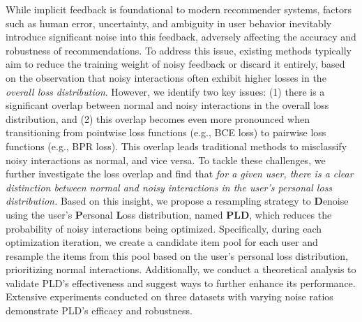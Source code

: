 
While implicit feedback is foundational to modern recommender systems, factors such as human error, uncertainty, and ambiguity in user behavior inevitably introduce significant noise into this feedback, adversely affecting the accuracy and robustness of recommendations. To address this issue, existing methods typically aim to reduce the training weight of noisy feedback or discard it entirely, based on the observation that noisy interactions often exhibit higher losses in the \textit{overall loss distribution}. However, we identify two key issues: (1) there is a significant overlap between normal and noisy interactions in the overall loss distribution, and (2) this overlap becomes even more pronounced when transitioning from pointwise loss functions (e.g., BCE loss) to pairwise loss functions (e.g., BPR loss). This overlap leads traditional methods to misclassify noisy interactions as normal, and vice versa. To tackle these challenges, we further investigate the loss overlap and find that \textit{for a given user, there is a clear distinction between normal and noisy interactions in the user's personal loss distribution.} Based on this insight, we propose a resampling strategy to \textbf{D}enoise using the user's \textbf{P}ersonal \textbf{L}oss distribution, named \textbf{PLD}, which reduces the probability of noisy interactions being optimized. Specifically, during each optimization iteration, we create a candidate item pool for each user and resample the items from this pool based on the user's personal loss distribution, prioritizing normal interactions. Additionally, we conduct a theoretical analysis to validate PLD's effectiveness and suggest ways to further enhance its performance. Extensive experiments conducted on three datasets with varying noise ratios demonstrate PLD's efficacy and robustness.



